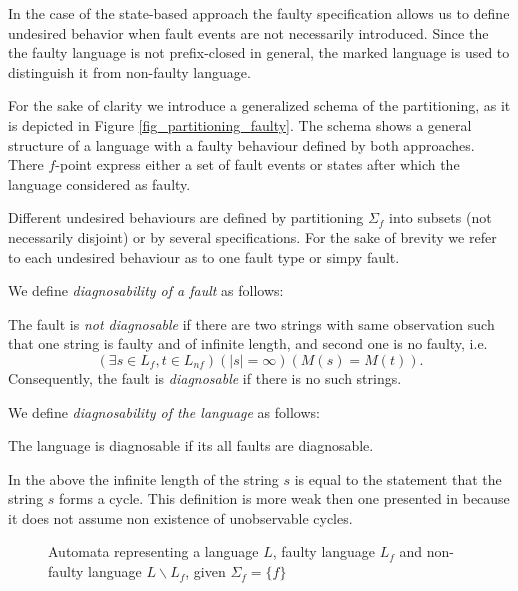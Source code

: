 \documentclass[a4paper, 10pt, conference]{ieeeconf} \IEEEoverridecommandlockouts
\begin{document}

In the case of the state-based approach the faulty specification
allows us to define undesired behavior when fault events are
not necessarily introduced. Since the the faulty language is not prefix-closed
in general, the marked language is used to distinguish it from non-faulty
language.


For the sake of clarity we introduce a generalized schema of the
partitioning, as it is depicted in Figure \ref{fig_partitioning_faulty}. The
schema shows a general structure of a language with a faulty behaviour defined
by both approaches. There $f$-point express either a set of fault events or
states after which the language considered as faulty.  

Different undesired behaviours are defined by partitioning $\Sigma_f$ into
subsets (not necessarily disjoint) or by several specifications. For the sake of
brevity we refer to each undesired behaviour as to one fault type or simpy
fault.

We define \emph{diagnosability of a fault} as follows:
\begin{definition} The fault is \emph{not diagnosable} if there are two strings
with same observation such that one string is faulty and of infinite length, and
second one is no faulty, i.e.
 $$
	(\exists s \in L_f, t \in L_{nf})(|s| = \infty)(M(s) = M(t)).
$$ 
Consequently, the fault is \emph{diagnosable} if there is no such strings.
\end{definition}
We define \emph{diagnosability of the language} as follows:
\begin{definition}
The language is diagnosable if its all faults are diagnosable.
\end{definition}

In the above the infinite length of the string $s$ is equal to the statement
that the string $s$ forms a cycle. This definition is more weak then one
presented in \cite{sampath_diagnosability_1995} because it does not assume non
existence of unobservable cycles.
   
\begin{figure}[t]
\centering

\caption{Automata representing a language $L$, faulty language $L_f$ and
non-faulty language $L \backslash L_f$, given $\Sigma_f = \{f\}$}
\label{fig_automaton_F-NF}
\end{figure}
\end{document}
